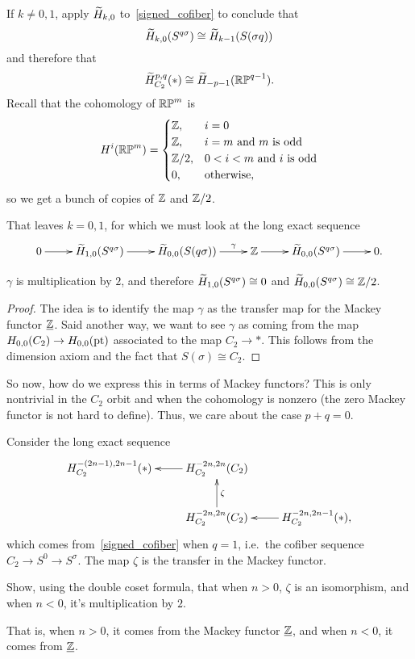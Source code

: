 If $k\ne 0,1$, apply $\widetilde H_{k,0}$ to~\eqref{signed_cofiber} to conclude that
\[\widetilde H_{k,0}(S^{q\sigma})\cong \widetilde H_{k-1}(S(\sigma q))\]
and therefore that
\[\widetilde H_{C_2}^{p,q}(*)\cong \widetilde H_{-p-1}(\mathbb{RP}^{q-1}).\]
Recall that the cohomology of $\mathbb{RP}^m$ is
\[H^i(\mathbb{RP}^m) = \begin{cases}
	\mathbb Z, &i = 0\\
	\mathbb Z, &i = m\text{ and $m$ is odd}\\
	\mathbb Z/2, &0 < i < m\text{ and $i$ is odd}\\
	0, &\text{otherwise,}
\end{cases}\]
so we get a bunch of copies of $\mathbb Z$ and $\mathbb Z/2$.

That leaves $k = 0,1$, for which we must look at the long exact sequence
\[\xymatrix{
	0\ar[r] & \wH_{1,0}(S^{q\sigma})\ar[r] & \wH_{0,0}(S(q\sigma))\ar[r]^-\gamma &\Z\ar[r] &
	\wH_{0,0}(S^{q\sigma})\ar[r] & 0.
}\]
\begin{claim}
$\gamma$ is multiplication by $2$, and therefore $\widetilde H_{1,0}(S^{q\sigma})\cong 0$ and
$\widetilde H_{0,0}(S^{q\sigma})\cong\mathbb Z/2$.
\end{claim}
\begin{proof}
The idea is to identify the map $\gamma$ as the transfer map for the Mackey functor $\underline{\mathbb Z}$. Said another
way, we want to see $\gamma$ as coming from the map $H_{0,0}(C_2)\to H_{0,0}(\mathrm{pt})$ associated to the map $C_2\to
*$. This follows from the dimension axiom and the fact that $S(\sigma)\cong C_2$.
\end{proof}
So now, how do we express this in terms of Mackey functors? This is only nontrivial in the $C_2$ orbit and when the
cohomology is nonzero (the zero Mackey functor is not hard to define). Thus, we care about the case $p+q = 0$.

Consider the long exact sequence
\[\xymatrix{
	H_{C_2}^{-(2n-1), 2n-1}(*) & H_{C_2}^{-2n,2n}(C_2)\ar[l]\\
	& H_{C_2}^{-2n,2n}(C_2)\ar[u]_\zeta & H_{C_2}^{-2n,2n-1}(*),\ar[l]
}\]
which comes from~\eqref{signed_cofiber} when $q = 1$, i.e.\ the cofiber sequence $C_2\to S^0\to S^\sigma$. The map
$\zeta$ is the transfer in the Mackey functor.
\begin{ex}
Show, using the double coset formula, that when $n > 0$, $\zeta$ is an isomorphism, and when $n < 0$, it's
multiplication by $2$.
\end{ex}
That is, when $n > 0$, it comes from the Mackey functor $\underline{\mathbb Z}$, and when $n < 0$, it comes from
$\underline{\mathbb Z}$.
